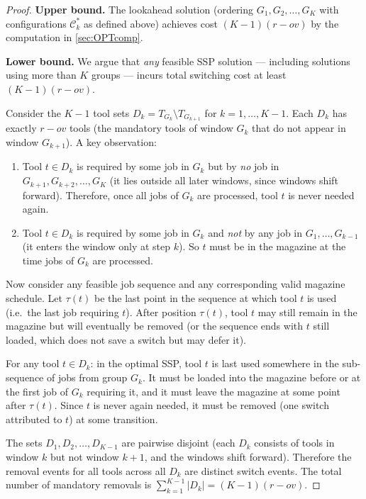 \documentclass[11pt,a4paper]{article}
\theoremstyle{plain}
\theoremstyle{definition}
\begin{document}
\begin{proofbox}
\begin{proof}
\textbf{Upper bound.}
The lookahead solution (ordering $G_1, G_2, \ldots, G_K$ with configurations
$\mathcal{C}_k^*$ as defined above) achieves cost $(K-1)(r-\mathit{ov})$
by the computation in \cref{sec:OPTcomp}. \checkmark

\medskip
\textbf{Lower bound.}
We argue that \emph{any} feasible SSP solution --- including solutions using
more than $K$ groups --- incurs total switching cost at least $(K-1)(r-\mathit{ov})$.

Consider the $K-1$ tool sets $D_k = T_{G_k} \setminus T_{G_{k+1}}$ for $k = 1,\ldots,K-1$.
Each $D_k$ has exactly $r - \mathit{ov}$ tools (the mandatory tools of window $G_k$ that
do not appear in window $G_{k+1}$). A key observation:

\begin{enumerate}[label=(\roman*)]
  \item Tool $t \in D_k$ is required by some job in $G_k$ but by \emph{no} job in
        $G_{k+1}, G_{k+2}, \ldots, G_K$ (it lies outside all later windows, since
        windows shift forward). Therefore, once all jobs of $G_k$ are processed, tool $t$
        is never needed again.
  \item Tool $t \in D_k$ is required by some job in $G_k$ and \emph{not} by any job in
        $G_1, \ldots, G_{k-1}$ (it enters the window only at step $k$). So $t$ must be
        in the magazine at the time jobs of $G_k$ are processed.
\end{enumerate}

Now consider any feasible job sequence and any corresponding valid magazine schedule.
Let $\tau(t)$ be the last point in the sequence at which tool $t$ is used
(i.e.\ the last job requiring $t$). After position $\tau(t)$, tool $t$ may still remain
in the magazine but will eventually be removed (or the sequence ends with $t$ still loaded,
which does not save a switch but may defer it).

For any tool $t \in D_k$: in the optimal SSP, tool $t$ is last used somewhere
in the sub-sequence of jobs from group $G_k$. It must be loaded into the magazine
before or at the first job of $G_k$ requiring it, and it must leave the magazine at
some point after $\tau(t)$. Since $t$ is never again needed, it must be removed
(one switch attributed to $t$) at some transition.

The sets $D_1, D_2, \ldots, D_{K-1}$ are pairwise disjoint (each $D_k$ consists of
tools in window $k$ but not window $k+1$, and the windows shift forward). Therefore
the removal events for all tools across all $D_k$ are distinct switch events.
The total number of mandatory removals is
$\sum_{k=1}^{K-1} |D_k| = (K-1)(r - \mathit{ov})$.


\end{proof}
\end{proofbox}
\end{document}
